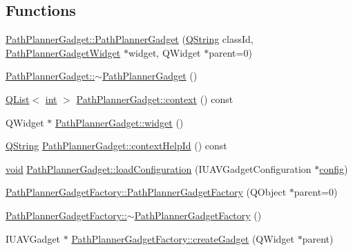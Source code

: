 \subsection*{Functions}
\begin{DoxyCompactItemize}
\item 
\hyperlink{group___path_planner_gadget_plugin_gac805c31521687b90ca55ae17a24e2cb0}{Path\-Planner\-Gadget\-::\-Path\-Planner\-Gadget} (\hyperlink{group___u_a_v_objects_plugin_gab9d252f49c333c94a72f97ce3105a32d}{Q\-String} class\-Id, \hyperlink{class_path_planner_gadget_widget}{Path\-Planner\-Gadget\-Widget} $\ast$widget, Q\-Widget $\ast$parent=0)
\item 
\hyperlink{group___path_planner_gadget_plugin_ga6531735ac3658c46d3d3dd5ddd539f58}{Path\-Planner\-Gadget\-::$\sim$\-Path\-Planner\-Gadget} ()
\item 
\hyperlink{class_q_list}{Q\-List}$<$ \hyperlink{ioapi_8h_a787fa3cf048117ba7123753c1e74fcd6}{int} $>$ \hyperlink{group___path_planner_gadget_plugin_ga6c2bd0fcf98faa6389c96a15430723d7}{Path\-Planner\-Gadget\-::context} () const 
\item 
Q\-Widget $\ast$ \hyperlink{group___path_planner_gadget_plugin_ga4a83272b91f2a0359dfb4d3d950c6ae4}{Path\-Planner\-Gadget\-::widget} ()
\item 
\hyperlink{group___u_a_v_objects_plugin_gab9d252f49c333c94a72f97ce3105a32d}{Q\-String} \hyperlink{group___path_planner_gadget_plugin_ga214a421178941f98f54bd3588c1634bc}{Path\-Planner\-Gadget\-::context\-Help\-Id} () const 
\item 
\hyperlink{group___u_a_v_objects_plugin_ga444cf2ff3f0ecbe028adce838d373f5c}{void} \hyperlink{group___path_planner_gadget_plugin_ga7606029076dafbc5e187ffeea2cbfdac}{Path\-Planner\-Gadget\-::load\-Configuration} (I\-U\-A\-V\-Gadget\-Configuration $\ast$\hyperlink{deflate_8c_a4473b5227787415097004fd39f55185e}{config})
\item 
\hyperlink{group___path_planner_gadget_plugin_ga88e48bf90ce31bd235b33782dfe905e9}{Path\-Planner\-Gadget\-Factory\-::\-Path\-Planner\-Gadget\-Factory} (Q\-Object $\ast$parent=0)
\item 
\hyperlink{group___path_planner_gadget_plugin_ga2dfd582034d463500837f0eaf0d01bd6}{Path\-Planner\-Gadget\-Factory\-::$\sim$\-Path\-Planner\-Gadget\-Factory} ()
\item 
I\-U\-A\-V\-Gadget $\ast$ \hyperlink{group___path_planner_gadget_plugin_gaae19a3f321bbfe2ff8c6f75d2202d22e}{Path\-Planner\-Gadget\-Factory\-::create\-Gadget} (Q\-Widget $\ast$parent)
\item 

\end{DoxyCompactItemize}
